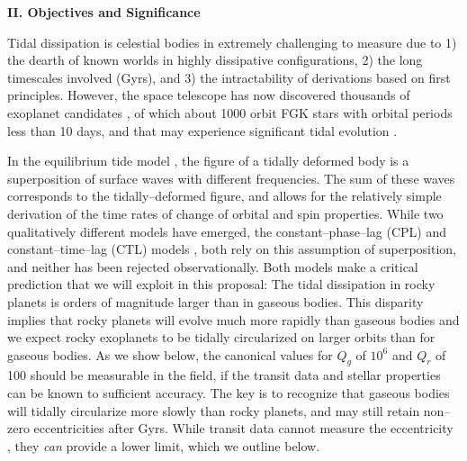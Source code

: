 \bigskip
\centerline{\bf II. Objectives and Significance}
\smallskip

\medskip
{\centerline{}}
\smallskip

Tidal dissipation is celestial bodies in extremely challenging to
measure
\citep{GoldreichSoter66,Hut81,AksnesFranklin01,Jackson08a,Jackson09,Lainey12}
due to 1) the dearth of known worlds in highly dissipative
configurations, 2) the long timescales involved (Gyrs), and 3) the
intractability of derivations based on first principles.  However,
the \kepler space telescope has now discovered thousands of exoplanet
candidates
\citep{2013ApJS..204...24B}, of which about 1000 orbit FGK stars with
orbital periods less than 10 days, and that may experience significant
tidal evolution \citep{Rasio96,Jackson08a,Matsumura10}.

In the equilibrium tide model
\citep{Darwin1880,MacDonald64,GoldreichSoter66,Hut81,FerrazMello08,Leconte10},
the figure of a tidally deformed body is a superposition of surface
waves with different frequencies.  The sum of these waves corresponds
to the tidally--deformed figure, and allows for the relatively simple
derivation of the time rates of change of orbital and spin properties.
While two qualitatively different models have emerged, the
constant--phase--lag (CPL) and constant--time--lag (CTL) models
\citep{Greenberg09}, both rely on this assumption of superposition,
and neither has been rejected observationally.  Both models make a
critical prediction that we will exploit in this proposal: The tidal
dissipation in rocky planets is orders of magnitude larger than in
gaseous bodies.  This disparity implies that rocky planets will evolve
much more rapidly than gaseous bodies and we expect rocky exoplanets
to be tidally circularized on larger orbits than for gaseous bodies.
As we show below, the canonical values for $Q_g$ of $10^6$ and $Q_r$
of 100 should be measurable in the \kepler field, if the transit data
and stellar properties can be known to sufficient accuracy.  The key
is to recognize that gaseous bodies will tidally circularize more
slowly than rocky planets, and may still retain non--zero
eccentricities after Gyrs.  While transit data cannot measure the
eccentricity \citep{Barnes07}, they {\it can} provide a lower limit,
which we outline below.

\medskip
{\centerline{}}
\smallskip

